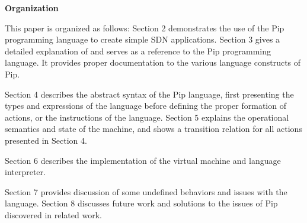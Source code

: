
\textbf{Organization}

This paper is organized as follows: Section 2 demonstrates the use of the Pip programming language to create simple SDN applications. Section 3 gives a detailed explanation of and serves as a reference to the Pip programming language. It provides proper documentation to the various language constructs of Pip.

Section 4 describes the abstract syntax of the Pip language, first presenting the types and expressions of the language before defining the proper formation of actions, or the instructions of the language. Section 5 explains the operational semantics and state of the machine, and shows a transition relation for all actions presented in Section 4.

Section 6 describes the implementation of the virtual machine and language interpreter.

Section 7 provides discussion of some undefined behaviors and issues with the language. Section 8 discusses future work and solutions to the issues of Pip discovered in related work.
